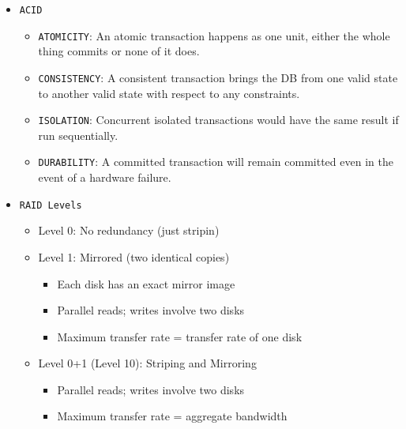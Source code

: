 \documentclass[landscape,8pt]{extarticle}
\newcommand{\code}{\lstinline}
\begin{document}
\footnotesize
\begin{multicols}{5}
    \setlength{\premulticols}{0pt}
    \setlength{\postmulticols}{0pt}
    \setlength{\multicolsep}{0pt}
    \setlength{\columnsep}{1pt}
    \begin{itemize}
        \item \code{ACID}
              \begin{itemize}
                  \item \code{ATOMICITY}: An atomic transaction happens as one unit, either the whole thing
                        commits or none of it does.
                  \item \code{CONSISTENCY}: A consistent transaction brings the DB from one valid state to
                        another valid state with respect to any constraints.
                  \item \code{ISOLATION}: Concurrent isolated transactions would have the same result if run sequentially.
                  \item \code{DURABILITY}: A committed transaction will remain committed even in the event of
                        a hardware failure.
              \end{itemize}
        \item \code{RAID Levels}
              \begin{itemize}
                  \item Level 0: No redundancy (just stripin)
                  \item Level 1: Mirrored (two identical copies)
                        \begin{itemize}
                            \item Each disk has an exact mirror image
                            \item Parallel reads; writes involve two disks
                            \item Maximum transfer rate = transfer rate of one disk
                        \end{itemize}
                  \item Level 0+1 (Level 10): Striping and Mirroring
                        \begin{itemize}
                            \item Parallel reads; writes involve two disks
                            \item Maximum transfer rate = aggregate bandwidth
                        \end{itemize}

\end{itemize}
\end{itemize}
\end{multicols}
\end{document}

